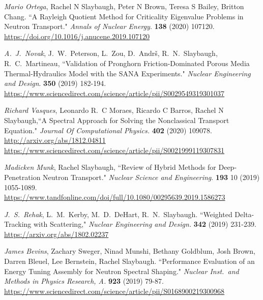 \begin{bibsection}
\item \textit{Mario Ortega}, Rachel N Slaybaugh, Peter N Brown, Teresa S Bailey,
Britton Chang. ``A Rayleigh Quotient Method for Criticality Eigenvalue Problems
in Neutron Transport." \textit{Annals of Nuclear Energy}. \textbf{138} (2020)
107120.\\
\url{https://doi.org/10.1016/j.anucene.2019.107120}

\item \textit{A.\ J.\ Novak}, J.\ W.\ Peterson, L.\ Zou, D.\ Andr\v{s}, R.\ N.\ Slaybaugh, R.\ C.\ Martineau, ``Validation of Pronghorn Friction-Dominated Porous Media Thermal-Hydraulics Model with the SANA Experiments." \textit{Nuclear Engineering and Design}. \textbf{350} (2019) 182-194.\\
\url{https://www.sciencedirect.com/science/article/pii/S0029549319301037}

\item \textit{Richard Vasques},  Leonardo R.\ C Moraes, Ricardo C Barros, Rachel
N Slaybaugh,``A Spectral Approach for Solving the Nonclassical Transport
Equation." \textit{Journal Of Computational Physics.} \textbf{402} (2020)
109078.\\
\url{http://arxiv.org/abs/1812.04811}\\
\url{https://www.sciencedirect.com/science/article/pii/S0021999119307831}

\item \textit{Madicken Munk}, Rachel Slaybaugh, ``Review of Hybrid Methods for Deep-Penetration Neutron Transport."  \textit{Nuclear Science and Engineering}. \textbf{193} 10 (2019) 1055-1089.\\
\url{https://www.tandfonline.com/doi/full/10.1080/00295639.2019.1586273}

\item \textit{J.\ S.\ Rehak}, L.\ M.\ Kerby, M.\ D.\ DeHart, R.\ N.\ Slaybaugh. ``Weighted Delta-Tracking with Scattering," \textit{Nuclear Engineering and Design.} \textbf{342} (2019) 231-239. \\
\url{https://arxiv.org/abs/1802.02237}

\item \textit{James Bevins}, Zachary Sweger, Ninad Munshi, Bethany Goldblum, Josh Brown, Darren Bleuel, Lee Bernstein, Rachel Slaybaugh. ``Performance Evaluation of an Energy Tuning Assembly for Neutron Spectral Shaping." \textit{Nuclear Inst.\ and Methods in Physics Research, A.} \textbf{923} (2019) 79-87.\\
\url{https://www.sciencedirect.com/science/article/pii/S0168900219300968}


\end{bibsection}
